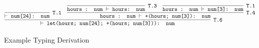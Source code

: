 \begin{figure}[htb]
\small
\[
\cinfer[T.6]{$\vdash$ let(hours; num[24]; +(hours; num[3])): num}
  {\cinfer[T.1]{$\vdash$ num[24]: num}{ }
   &
   \cinfer[T.4]{hours : num $\vdash$ +(hours; num[3]): num}
     {\cinfer[T.3]{hours : num $\vdash$ hours: num}{ }
      &
      \cinfer[T.1]{hours : num $\vdash$ num[3]: num}{ }
     }
  }
\]
\caption{Example Typing Derivation}
\label{fig:type_derive} 
\end{figure}